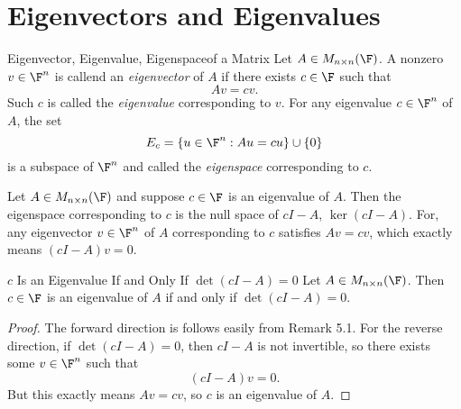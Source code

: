 \documentclass[linearalgebraI]{subfiles}
\begin{document}

    \section{Eigenvectors and Eigenvalues}
    
    \begin{definition}{Eigenvector, Eigenvalue, Eigenspace}{of a Matrix}
        Let $A\in M_{n\times n}(\F)$. A nonzero $v\in \F^n$ is callend an \emph{eigenvector} of $A$ if there exists $c\in \F$ such that
        \begin{equation*}
            Av = c v.
        \end{equation*}
        Such $c$ is called the \emph{eigenvalue} corresponding to $v$. For any eigenvalue $c\in\F^n$ of $A$, the set
        \begin{equation*}
            E_c = \left\lbrace u\in\F^n: Au = c u \right\rbrace \cup \left\lbrace 0 \right\rbrace
        \end{equation*}
        is a subspace of $\F^n$ and called the \emph{eigenspace} corresponding to $c$.
    \end{definition}

    \begin{remark}
        Let $A\in M_{n\times n}(\F)$ and suppose $c\in\F$ is an eigenvalue of $A$. Then the eigenspace corresponding to $c$ is the null space of $cI-A$, $\ker(cI-A)$. For, any eigenvector $v\in\F^n$ of $A$ corresponding to $c$ satisfies $Av = cv$, which exactly means $\left( cI-A \right) v = 0$.
    \end{remark}

    \begin{prop}{$c$ Is an Eigenvalue If and Only If $\det \left( cI-A \right) =0$}
        Let $A\in M_{n\times n}(\F)$. Then $c\in\F$ is an eigenvalue of $A$ if and only if $\det \left( cI-A \right) = 0$.
    \end{prop}
    
    \begin{proof}
        The forward direction is follows easily from Remark 5.1. For the reverse direction, if $\det\left( cI-A \right) = 0$, then $cI-A$ is not invertible, so there exists some $v\in\F^n$ such that
        \begin{equation*}
            \left( cI-A \right) v = 0.
        \end{equation*}
        But this exactly means $Av = c v$, so $c$ is an eigenvalue of $A$.
    \end{proof}
\end{document}
